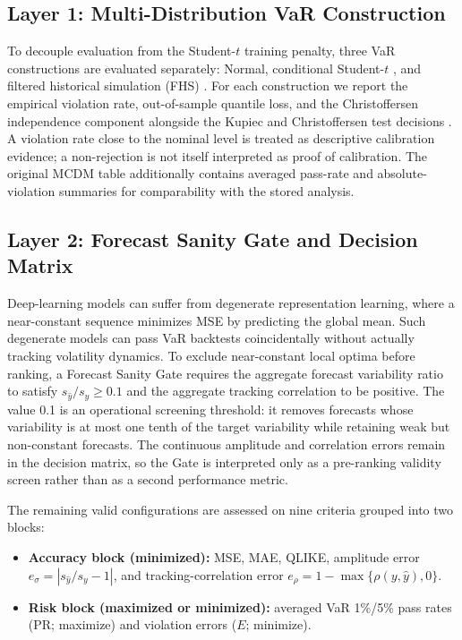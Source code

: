 \documentclass[runningheads]{llncs}
\begin{document}
\subsection{Layer 1: Multi-Distribution VaR Construction}
To decouple evaluation from the Student-$t$ training penalty, three VaR constructions are evaluated separately: Normal, conditional Student-$t$ \cite{ref10}, and filtered historical simulation (FHS) \cite{ref11}. For each construction we report the empirical violation rate, out-of-sample quantile loss, and the Christoffersen independence component alongside the Kupiec and Christoffersen test decisions \cite{ref12,ref13}. A violation rate close to the nominal level is treated as descriptive calibration evidence; a non-rejection is not itself interpreted as proof of calibration. The original MCDM table additionally contains averaged pass-rate and absolute-violation summaries for comparability with the stored analysis.

\subsection{Layer 2: Forecast Sanity Gate and Decision Matrix}
Deep-learning models can suffer from degenerate representation learning, where a near-constant sequence minimizes MSE by predicting the global mean. Such degenerate models can pass VaR backtests coincidentally without actually tracking volatility dynamics. To exclude near-constant local optima before ranking, a Forecast Sanity Gate requires the aggregate forecast variability ratio to satisfy $s_{\hat{y}}/s_y \ge 0.1$ and the aggregate tracking correlation to be positive. The value 0.1 is an operational screening threshold: it removes forecasts whose variability is at most one tenth of the target variability while retaining weak but non-constant forecasts. The continuous amplitude and correlation errors remain in the decision matrix, so the Gate is interpreted only as a pre-ranking validity screen rather than as a second performance metric.

The remaining valid configurations are assessed on nine criteria grouped into two blocks:
\begin{itemize}
\item \textbf{Accuracy block (minimized):} MSE, MAE, QLIKE, amplitude error $e_\sigma = |s_{\hat{y}}/s_y - 1|$, and tracking-correlation error $e_\rho = 1 - \max\{\rho(y, \hat{y}), 0\}$.
\item \textbf{Risk block (maximized or minimized):} averaged VaR 1\%/5\% pass rates (PR; maximize) and violation errors ($E$; minimize).
\end{itemize}
\end{document}
